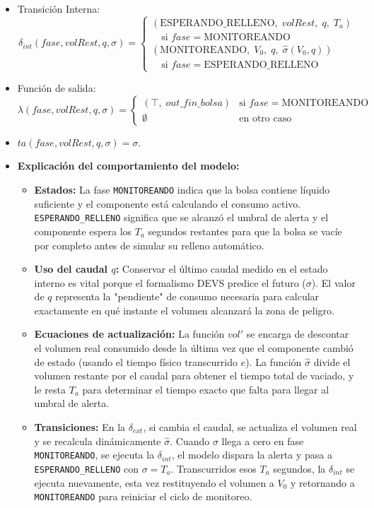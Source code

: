 \begin{itemize}
    \item Transición Interna:
    \[
    \delta_{int}(fase, volRest, q, \sigma) =
    \begin{cases}
    (\text{ESPERANDO\_RELLENO},\; volRest,\; q,\; T_a) \\
    \quad \text{si } fase = \text{MONITOREANDO} \\[2ex]
    (\text{MONITOREANDO},\; V_0,\; q,\; \hat{\sigma}(V_0, q)) \\
    \quad \text{si } fase = \text{ESPERANDO\_RELLENO}
    \end{cases}
    \]

    \item Función de salida:
    \[
    \lambda(fase, volRest, q, \sigma) =
    \begin{cases}
    (\top,\; out\_fin\_bolsa) & \text{si } fase = \text{MONITOREANDO} \\
    \emptyset & \text{en otro caso}
    \end{cases}
    \]

    \item $ta(fase, volRest, q, \sigma) = \sigma$.
    \item \textbf{Explicación del comportamiento del modelo:}
    \begin{itemize}
        \item \textbf{Estados:} La fase \texttt{MONITOREANDO} indica que la bolsa contiene líquido suficiente y el componente está calculando el consumo activo. \texttt{ESPERANDO\_RELLENO} significa que se alcanzó el umbral de alerta y el componente espera los $T_a$ segundos restantes para que la bolsa se vacíe por completo antes de simular su relleno automático.
        \item \textbf{Uso del caudal $q$:} Conservar el último caudal medido en el estado interno es vital porque el formalismo DEVS predice el futuro ($\sigma$). El valor de $q$ representa la "pendiente" de consumo necesaria para calcular exactamente en qué instante el volumen alcanzará la zona de peligro.
        \item \textbf{Ecuaciones de actualización:} La función $vol'$ se encarga de descontar el volumen real consumido desde la última vez que el componente cambió de estado (usando el tiempo físico transcurrido $e$). La función $\hat{\sigma}$ divide el volumen restante por el caudal para obtener el tiempo total de vaciado, y le resta $T_a$ para determinar el tiempo exacto que falta para llegar al umbral de alerta.
        \item \textbf{Transiciones:} En la $\delta_{ext}$, si cambia el caudal, se actualiza el volumen real y se recalcula dinámicamente $\hat{\sigma}$. Cuando $\sigma$ llega a cero en fase \texttt{MONITOREANDO}, se ejecuta la $\delta_{int}$, el modelo dispara la alerta y pasa a \texttt{ESPERANDO\_RELLENO} con $\sigma = T_a$. Transcurridos esos $T_a$ segundos, la $\delta_{int}$ se ejecuta nuevamente, esta vez restituyendo el volumen a $V_0$ y retornando a \texttt{MONITOREANDO} para reiniciar el ciclo de monitoreo.
    \end{itemize}
\end{itemize}

